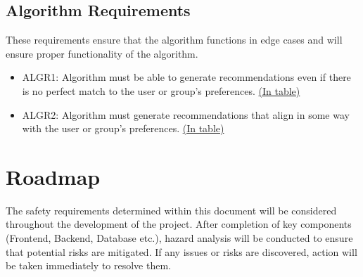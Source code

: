 \documentclass[12pt]{article}
\begin{document}
\subsection{Algorithm Requirements}
These requirements ensure that the algorithm functions in edge cases and will ensure proper functionality of the algorithm.
\begin{itemize}
	\item ALGR1: Algorithm must be able to generate recommendations even if there is no perfect match to the user or group's preferences. \hyperref[table2]{(In table)}
	\item ALGR2: Algorithm must generate recommendations that align in some way with the user or group's preferences. \hyperref[table2]{(In table)}
\end{itemize}


\section{Roadmap}
The safety requirements determined within this document will be considered throughout the development of the project. After completion of key components (Frontend, Backend, Database etc.), hazard analysis will be conducted to ensure that potential risks are mitigated. If any issues or risks are discovered, action will be taken immediately to resolve them.
\end{document}
